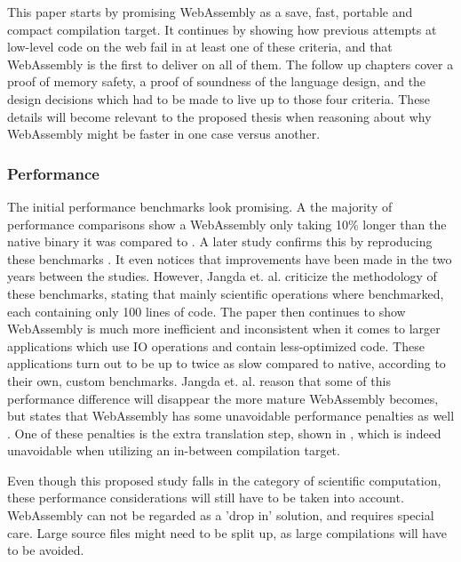 This paper starts by promising WebAssembly as a save, fast, portable and compact compilation target. It continues by showing how previous attempts at low-level code on the web fail in at least one of these criteria, and that WebAssembly is the first to deliver on all of them. The follow up chapters cover a proof of memory safety, a proof of soundness of the language design, and the design decisions which had to be made to live up to those four criteria. These details will become relevant to the proposed thesis when reasoning about why WebAssembly might be faster in one case versus another.

\subsubsection*{Performance}

The initial performance benchmarks look promising. A the majority of performance comparisons show a WebAssembly only taking 10\% longer than the native binary it was compared to \cite{haas_bringing_2017}. A later study confirms this by reproducing these benchmarks \cite{jangda_not_2019}. It even notices that improvements have been made in the two years between the studies. However, Jangda et. al. criticize the methodology of these benchmarks, stating that mainly scientific operations where benchmarked, each containing only 100 lines of code. The paper then continues to show WebAssembly is much more inefficient and inconsistent when it comes to larger applications which use IO operations and contain less-optimized code. These applications turn out to be up to twice as slow compared to native, according to their own, custom benchmarks. Jangda et. al. reason that some of this performance difference will disappear the more mature WebAssembly becomes, but states that WebAssembly has some unavoidable performance penalties as well \cite{jangda_not_2019}. One of these penalties is the extra translation step, shown in , which is indeed unavoidable when utilizing an in-between compilation target. 

Even though this proposed study falls in the category of scientific computation, these performance considerations will still have to be taken into account. WebAssembly can not be regarded as a 'drop in' solution, and requires special care. Large source files might need to be split up, as large compilations will have to be avoided.  

